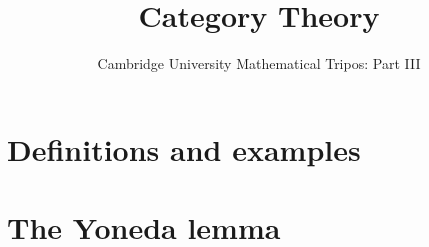 \documentclass{article}
\title{Category Theory}
\author{Cambridge University Mathematical Tripos: Part III}
\begin{document}
\maketitle

\tableofcontentsnewpage{}

\section{Definitions and examples}

\section{The Yoneda lemma}

\end{document}
